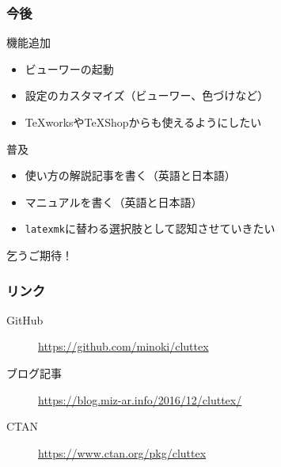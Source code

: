\documentclass[aspectratio=169]{beamer}
\begin{document}
\begin{frame}\frametitle{今後}
  \begin{block}{機能追加}
    \begin{itemize}
    \item ビューワーの起動
    \item 設定のカスタマイズ（ビューワー、色づけなど）
    \item \TeX worksや\TeX Shopからも使えるようにしたい
    \end{itemize}
  \end{block}

  \begin{block}{普及}
    \begin{itemize}
    \item 使い方の解説記事を書く（英語と日本語）
    \item マニュアルを書く（英語と日本語）
    \item \texttt{latexmk}に替わる選択肢として認知させていきたい
    \end{itemize}
  \end{block}

  \begin{center}
    \LARGE 乞うご期待！
  \end{center}
\end{frame}
\begin{frame}\frametitle{リンク}
  \begin{description}
  \item[GitHub] \url{https://github.com/minoki/cluttex}
  \item[ブログ記事] \url{https://blog.miz-ar.info/2016/12/cluttex/}
  \item[CTAN] \url{https://www.ctan.org/pkg/cluttex}
  \end{description}
\end{frame}
\end{document}
